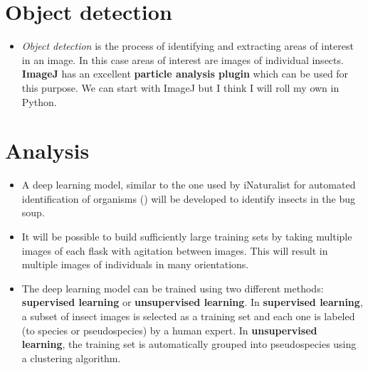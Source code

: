 \documentclass[12pt,letterpaper,english,bibliography=totocnumbered, abstract=on]{scrartcl}
\begin{document}
\section{Object detection}

\begin{itemize}
	\item \textit{Object detection} is the process of identifying and extracting areas of interest in an image. In this case areas of interest are images of individual insects. \textbf{ImageJ} has an excellent \textbf{particle analysis plugin} which can be used for this purpose. We can start with ImageJ but I think I will roll my own in Python.
\end{itemize}


\section{Analysis}

\begin{itemize}
	\item A deep learning model, similar to the one used by iNaturalist for automated identification of organisms (\cite{ken-ichiuedaOverviewOfComputerVision2020}) will be developed to identify insects in the bug soup.
	
	\item It will be possible to build sufficiently large training sets by taking multiple images of each flask with agitation between images. This will result in multiple images of individuals in many orientations.
	
	\item The deep learning model can be trained using two different methods: \textbf{supervised learning} or \textbf{unsupervised learning}. In \textbf{supervised learning}, a subset of insect images is selected as a training set and each one is labeled (to species or pseudospecies) by a human expert. In \textbf{unsupervised learning}, the training set is automatically grouped into pseudospecies using a clustering algorithm.  	 
\end{itemize}

\newpage
\printbibliography
\end{document}
